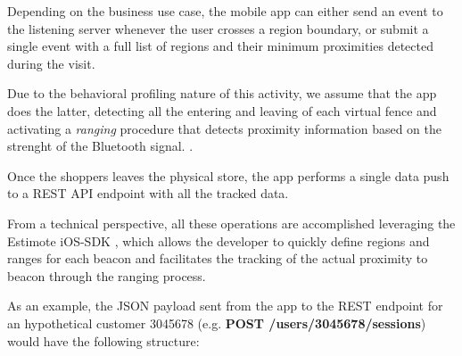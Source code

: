 Depending on the business use case, the mobile app can either send an event to the listening server whenever the user crosses a region boundary, or submit a single event with a full list of regions and their minimum proximities detected during the visit. 

Due to the behavioral profiling nature of this activity, we assume that the app does the latter, detecting all the entering and leaving of each virtual fence and activating a \textit{ranging} procedure that detects proximity information based on the strenght of the Bluetooth signal. \cite{region-monitoring-apple}.

Once the shoppers leaves the physical store, the app performs a single data push to a REST API endpoint with all the tracked data.

From a technical perspective, all these operations are accomplished leveraging the Estimote iOS-SDK \cite{estimote-ios-sdk}, which allows the developer to quickly define regions and ranges for each beacon and facilitates the tracking of the actual proximity to beacon through the ranging process.

As an example, the JSON payload sent from the app to the REST endpoint for an hypothetical customer 3045678 (e.g. \textbf{POST /users/3045678/sessions}) would have the following structure:


